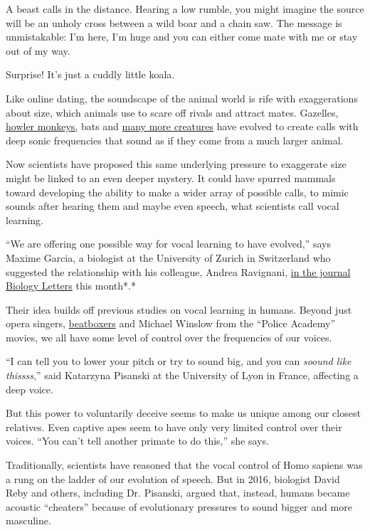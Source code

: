 A beast calls in the distance. Hearing a low rumble, you might imagine
the source will be an unholy cross between a wild boar and a chain saw.
The message is unmistakable: I'm here, I'm huge and you can either come
mate with me or stay out of my way.

Surprise! It's just a cuddly little koala.

Like online dating, the soundscape of the animal world is rife with
exaggerations about size, which animals use to scare off rivals and
attract mates. Gazelles,
\href{https://www.nytimes3xbfgragh.onion/2015/10/23/science/howler-monkey-species-deep-voice-testicle-size.html}{howler
monkeys,} bats and
\href{https://www.nature.com/articles/ncomms12739}{many more creatures}
have evolved to create calls with deep sonic frequencies that sound as
if they come from a much larger animal.

Now scientists have proposed this same underlying pressure to exaggerate
size might be linked to an even deeper mystery. It could have spurred
mammals toward developing the ability to make a wider array of possible
calls, to mimic sounds after hearing them and maybe even speech, what
scientists call vocal learning.

``We are offering one possible way for vocal learning to have evolved,''
says Maxime Garcia, a biologist at the University of Zurich in
Switzerland who suggested the relationship with his colleague, Andrea
Ravignani,
\href{https://royalsocietypublishing.org/doi/full/10.1098/rsbl.2020.0081?af=R}{in
the journal Biology Letters} this month*.*

Their idea builds off previous studies on vocal learning in humans.
Beyond just opera singers,
\href{https://www.nytimes3xbfgragh.onion/2018/11/07/science/beatboxing-mri-scanner.html}{beatboxers}
and Michael Winslow from the ``Police Academy'' movies, we all have some
level of control over the frequencies of our voices.

``I can tell you to lower your pitch or try to sound big, and you can
\emph{soound like thissss},'' said Katarzyna Pisanski at the University
of Lyon in France, affecting a deep voice.

But this power to voluntarily deceive seems to make us unique among our
closest relatives. Even captive apes seem to have only very limited
control over their voices. ``You can't tell another primate to do
this,'' she says.

Traditionally, scientists have reasoned that the vocal control of Homo
sapiens was a rung on the ladder of our evolution of speech. But in
2016, biologist David Reby and others, including Dr. Pisanski, argued
that, instead, humans became acoustic ``cheaters'' because of
evolutionary pressures to sound bigger and more masculine.


